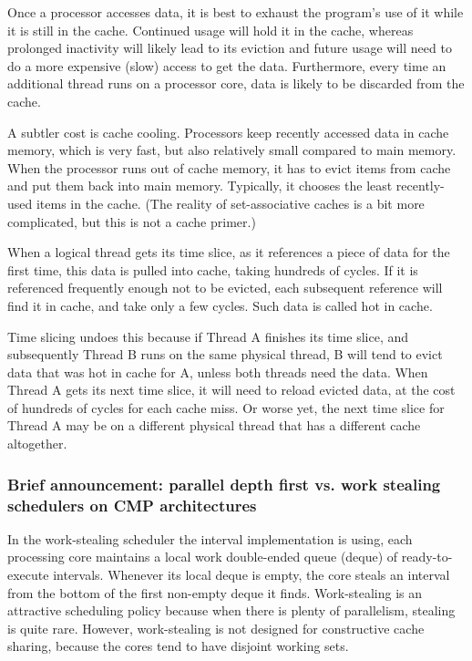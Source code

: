 Once a processor accesses data, it is best to exhaust the program’s
use of it while it is still in the cache. Continued usage will hold it
in the cache, whereas prolonged inactivity will likely lead to its
eviction and future usage will need to do a more expensive (slow)
access to get the data. Furthermore, every time an additional thread
runs on a processor core, data is likely to be discarded from the
cache.

A subtler cost is cache cooling. Processors keep recently accessed
data in cache memory, which is very fast, but also relatively small
compared to main memory. When the processor runs out of cache memory,
it has to evict items from cache and put them back into main
memory. Typically, it chooses the least recently-used items in the
cache. (The reality of set-associative caches is a bit more
complicated, but this is not a cache primer.)

When a logical thread gets its time slice, as it references a piece of
data for the first time, this data is pulled into cache, taking
hundreds of cycles. If it is referenced frequently enough not to be
evicted, each subsequent reference will find it in cache, and take
only a few cycles. Such data is called hot in cache.

Time slicing undoes this because if Thread A finishes its time slice,
and subsequently Thread B runs on the same physical thread, B will
tend to evict data that was hot in cache for A, unless both threads
need the data. When Thread A gets its next time slice, it will need to
reload evicted data, at the cost of hundreds of cycles for each cache
miss. Or worse yet, the next time slice for Thread A may be on a
different physical thread that has a different cache altogether.

\subsubsection{Brief announcement: parallel depth first vs. work
  stealing schedulers on CMP architectures \cite{Liaskovitis2006}}

In the work-stealing scheduler the interval implementation is using,
each processing core maintains a local work double-ended queue (deque)
of ready-to-execute intervals. Whenever its local deque is empty, the
core steals an interval from the bottom of the first non-empty deque
it finds. Work-stealing is an attractive scheduling policy because
when there is plenty of parallelism, stealing is quite rare. However,
work-stealing is not designed for constructive cache sharing, because
the cores tend to have disjoint working sets.

